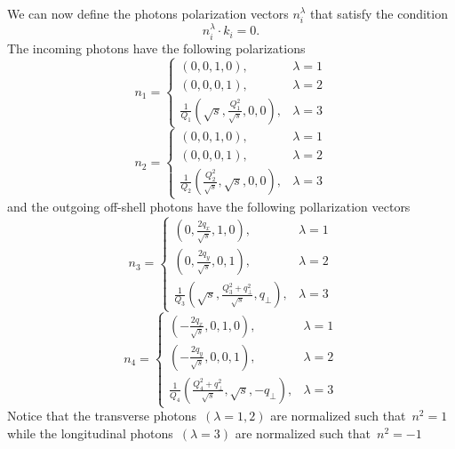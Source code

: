 \documentclass[preprint, 12pt]{elsarticle}
\begin{document}
We can now define the photons polarization vectors $n^\lambda_i$ that satisfy the condition
\begin{equation}
n_i^\lambda \cdot k_i = 0.
\end{equation}
The incoming photons have the following polarizations
\begin{equation}
    n_1=
    \begin{cases}
      \left(0,0,1,0\right), & \lambda=1 \\
      \left(0,0,0,1\right), & \lambda=2 \\
      \frac{1}{Q_1} \left( \sqrt{s}, \frac{Q_1^2}{\sqrt{s}}, 0, 0 \right), & \lambda = 3
    \end{cases}
\end{equation}
\begin{equation}
    n_2=
    \begin{cases}
      \left(0,0,1,0\right), & \lambda=1 \\
      \left(0,0,0,1\right), & \lambda=2 \\
      \frac{1}{Q_2} \left( \frac{Q_2^2}{\sqrt{s}}, \sqrt{s}, 0, 0 \right), & \lambda = 3
    \end{cases}
\end{equation}  
and the outgoing off-shell photons have the following pollarization vectors
\begin{equation}
    n_3=
    \begin{cases}
      \left(0,\frac{2 q_x}{\sqrt{s}},1,0\right), & \lambda=1 \\
      \left(0,\frac{2 q_y}{\sqrt{s}},0,1\right), & \lambda=2 \\
      \frac{1}{Q_3} \left(\sqrt{s}, \frac{Q_3^2+q_\perp^2}{\sqrt{s}}, q_\perp \right), & \lambda = 3
    \end{cases}
\end{equation}  
\begin{equation}
    n_4=
    \begin{cases}
      \left(-\frac{2 q_x}{\sqrt{s}},0,1,0\right), & \lambda=1 \\
      \left(-\frac{2 q_y}{\sqrt{s}},0,0,1\right), & \lambda=2 \\
      \frac{1}{Q_4} \left(\frac{Q_4^2+q_\perp^2}{\sqrt{s}},\sqrt{s},- q_\perp \right), & \lambda = 3
    \end{cases}
\end{equation}
Notice that the transverse photons~$\left(\lambda=1,2\right)$ are normalized such that~$n^2 = 1$ while the longitudinal photons~$\left(\lambda=3\right)$ are normalized such that~$n^2 = -1$
\end{document}
